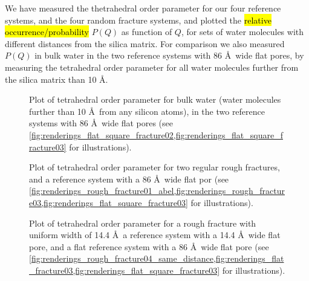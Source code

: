 We have measured the thetrahedral order parameter for our four reference systems, and the four random fracture systems, and plotted the \hl{relative occurrence/probability} $P(Q)$ as function of $Q$, for sets of water molecules with different distances from the silica matrix. For comparison we also measured $P(Q)$ in bulk water in the two reference systems with 86 \AA\ wide flat pores, by measuring the tetrahedral order parameter for all water molecules further from the silica matrix than 10 \AA.
%
\begin{figure}[htpb]%
    \centering%
    \caption{%
        Plot of tetrahedral order parameter for bulk water (water molecules further than 10 \AA\ from any silicon atoms), in the two reference systems with 86 \AA\ wide flat pores (see \cref{fig:renderings_flat_square_fracture02,fig:renderings_flat_square_fracture03} for illustrations).%
    }%
\end{figure}%
%
\begin{figure}[!p]%
    \centering%
    {
        \captionsetup{width=\textwidth} 
        \caption{%
            Plot of tetrahedral order parameter for two regular rough fractures, and a reference system with a 86 \AA\ wide flat por (see \cref{fig:renderings_rough_fracture01_abel,fig:renderings_rough_fracture03,fig:renderings_flat_square_fracture03} for illustrations).%
        }%
    }
\end{figure}%
%
\begin{figure}[!p]%
    \centering%
    {
        \captionsetup{width=\textwidth} 
        \caption{%
            Plot of tetrahedral order parameter for a rough fracture with uniform width of 14.4 \AA\, a reference system with a 14.4 \AA\ wide flat pore, and a flat reference system with a 86 \AA\ wide flat pore (see \cref{fig:renderings_rough_fracture04_same_distance,fig:renderings_flat_fracture03,fig:renderings_flat_square_fracture03} for illustrations).%
        }%
    }
\end{figure}%
